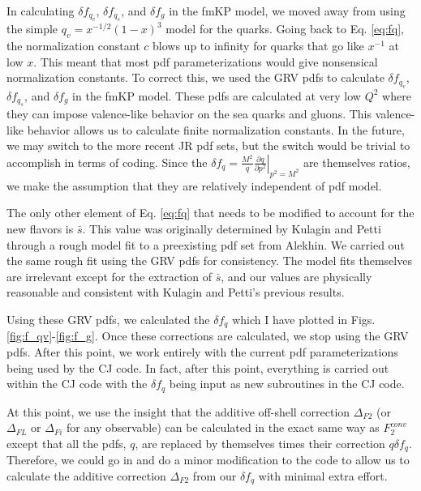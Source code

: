 \documentclass[12pt]{article}
\newcommand{\pder}[2]{\frac{\partial #1}{\partial #2}}
\begin{document}
In calculating $\delta f_{q_v}$, $\delta f_{q_s}$, and $\delta f_g$ in the fmKP model, we moved away from using the simple $q_v=x^{-1/2}(1-x)^3$ model for the quarks.  Going back to Eq. \ref{eq:fq}, the normalization constant $c$ blows up to infinity for quarks that go like $x^{-1}$ at low $x$.  This meant that most pdf parameterizations would give nonsensical normalization constants.  To correct this, we used the GRV pdfs to calculate $\delta f_{q_v}$, $\delta f_{q_s}$, and $\delta f_g$ in the fmKP model.  These pdfs are calculated at very low $Q^2$ where they can impose valence-like behavior on the sea quarks and gluons.  This valence-like behavior allows us to calculate finite normalization constants.  In the future, we may switch to the more recent JR pdf sets, but the switch would be trivial to accomplish in terms of coding.  Since the $\delta f_q = \left.\frac{M^2}{q}\pder{q}{p^2}\right|_{p^2=M^2}$ are themselves ratios, we make the assumption that they are relatively independent of pdf model.

The only other element of Eq. \ref{eq:fq} that needs to be modified to account for the new flavors is $\bar{s}$.  This value was originally determined by Kulagin and Petti through a rough model fit to a preexisting pdf set from Alekhin.  We carried out the same rough fit using the GRV pdfs for consistency.  The model fits themselves are irrelevant except for the extraction of $\bar{s}$, and our values are physically reasonable and consistent with Kulagin and Petti's previous results.

Using these GRV pdfs, we calculated the $\delta f_q$ which I have plotted in Figs. \ref{fig:f_qv}-\ref{fig:f_g}.  Once these corrections are calculated, we stop using the GRV pdfs.  After this point, we work entirely with the current pdf parameterizations being used by the CJ code.  In fact, after this point, everything is carried out within the CJ code with the $\delta f_q$ being input as new subroutines in the CJ code.

At this point, we use the insight that the additive off-shell correction $\Delta_{F2}$ (or $\Delta_{FL}$ or $\Delta_{Fi}$ for any observable) can be calculated in the exact same way as $F_2^{conv}$ except that all the pdfs, $q$, are replaced by themselves times their correction $q\delta f_q$.  Therefore, we could go in and do a minor modification to the code to allow us to calculate the additive correction $\Delta_{F2}$ from our $\delta f_q$ with minimal extra effort.
\end{document}
